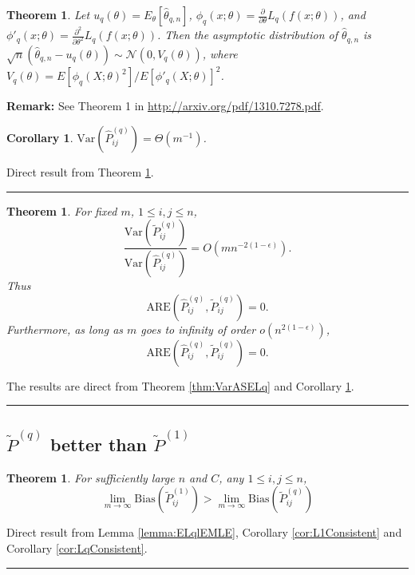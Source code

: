 \documentclass[a4paper]{article}
\newenvironment{proof}{{\bf Proof:  }}{\hfill\rule{2mm}{2mm}}
\newtheorem{theorem}[fact]{Theorem}
\newtheorem{corollary}[fact]{Corollary}
\begin{document}
\begin{theorem}
\label{thm:VarLq}
Let $u_q(\theta) = E_{\theta}[\hat{\theta}_{q,n}]$, $\phi_q(x;\theta) = \frac{\partial}{\partial \theta}L_q(f(x;\theta))$, and $\phi'_q(x;\theta) = \frac{\partial^2}{\partial \theta^2}L_q(f(x;\theta))$. Then the asymptotic distribution of $\hat{\theta}_{q,n}$ is $\sqrt{n}(\hat{\theta}_{q,n} - u_q(\theta)) \sim \mathcal{N}(0, V_q(\theta))$, where $V_q(\theta) = E[\phi_q(X;\theta)^2]/E[\phi'_q(X;\theta)]^2$.
\end{theorem}
\textbf{Remark:} See Theorem 1 in \href{url}{http://arxiv.org/pdf/1310.7278.pdf}.

\begin{corollary}
\label{cor:VarLq}
$\mathrm{Var}(\hat{P}^{(q)}_{ij}) = \Theta(m^{-1})$.
\end{corollary}
\begin{proof}
Direct result from Theorem \ref{thm:VarLq}.
\end{proof}


\begin{theorem}
\label{thm:ARELq}
For fixed $m$, $1 \le i, j \le n$,
\[
	\frac{\mathrm{Var}(\widetilde{P}_{ij}^{(q)})}{\mathrm{Var}(\hat{P}_{ij}^{(q)})}
    = O(m n^{-2(1-\epsilon)}).
\]
Thus
\[
	\mathrm{ARE}(\hat{P}_{ij}^{(q)}, \widetilde{P}_{ij}^{(q)}) = 0.
\]
Furthermore, as long as $m$ goes to infinity of order $o(n^{2(1-\epsilon)})$,
\[
	\mathrm{ARE}(\hat{P}_{ij}^{(q)}, \widetilde{P}_{ij}^{(q)}) = 0.
\]
\end{theorem}
\begin{proof}
The results are direct from Theorem \ref{thm:VarASELq} and Corollary \ref{cor:VarLq}.
\end{proof}



\subsection{$\widetilde{P}^{(q)}$ better than $\widetilde{P}^{(1)}$}

\begin{theorem}
\label{thm:biasL1andLq}
For sufficiently large $n$ and $C$, any $1 \le i,j \le n$,
\[
	\lim_{m \to \infty} \mathrm{Bias}(\widetilde{P}_{ij}^{(1)})
    > \lim_{m \to \infty} \mathrm{Bias}(\widetilde{P}_{ij}^{(q)})
\]
\end{theorem}
\begin{proof}
Direct result from Lemma \ref{lemma:ELqlEMLE}, Corollary \ref{cor:L1Consistent} and Corollary \ref{cor:LqConsistent}.
\end{proof}
\end{document}
